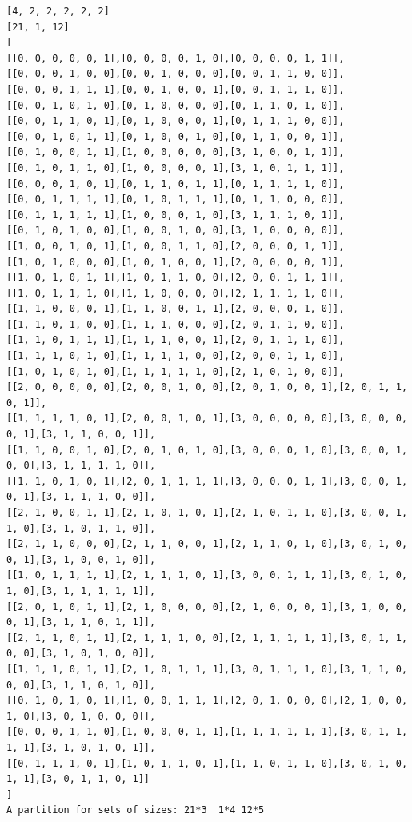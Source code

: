 \documentclass[final]{dmtcs-episciences}
\begin{document}
\begin{appendices}
\begin{verbatim} 
[4, 2, 2, 2, 2, 2]
[21, 1, 12]
[
[[0, 0, 0, 0, 0, 1],[0, 0, 0, 0, 1, 0],[0, 0, 0, 0, 1, 1]],
[[0, 0, 0, 1, 0, 0],[0, 0, 1, 0, 0, 0],[0, 0, 1, 1, 0, 0]],
[[0, 0, 0, 1, 1, 1],[0, 0, 1, 0, 0, 1],[0, 0, 1, 1, 1, 0]],
[[0, 0, 1, 0, 1, 0],[0, 1, 0, 0, 0, 0],[0, 1, 1, 0, 1, 0]],
[[0, 0, 1, 1, 0, 1],[0, 1, 0, 0, 0, 1],[0, 1, 1, 1, 0, 0]],
[[0, 0, 1, 0, 1, 1],[0, 1, 0, 0, 1, 0],[0, 1, 1, 0, 0, 1]],
[[0, 1, 0, 0, 1, 1],[1, 0, 0, 0, 0, 0],[3, 1, 0, 0, 1, 1]],
[[0, 1, 0, 1, 1, 0],[1, 0, 0, 0, 0, 1],[3, 1, 0, 1, 1, 1]],
[[0, 0, 0, 1, 0, 1],[0, 1, 1, 0, 1, 1],[0, 1, 1, 1, 1, 0]],
[[0, 0, 1, 1, 1, 1],[0, 1, 0, 1, 1, 1],[0, 1, 1, 0, 0, 0]],
[[0, 1, 1, 1, 1, 1],[1, 0, 0, 0, 1, 0],[3, 1, 1, 1, 0, 1]],
[[0, 1, 0, 1, 0, 0],[1, 0, 0, 1, 0, 0],[3, 1, 0, 0, 0, 0]],
[[1, 0, 0, 1, 0, 1],[1, 0, 0, 1, 1, 0],[2, 0, 0, 0, 1, 1]],
[[1, 0, 1, 0, 0, 0],[1, 0, 1, 0, 0, 1],[2, 0, 0, 0, 0, 1]],
[[1, 0, 1, 0, 1, 1],[1, 0, 1, 1, 0, 0],[2, 0, 0, 1, 1, 1]],
[[1, 0, 1, 1, 1, 0],[1, 1, 0, 0, 0, 0],[2, 1, 1, 1, 1, 0]],
[[1, 1, 0, 0, 0, 1],[1, 1, 0, 0, 1, 1],[2, 0, 0, 0, 1, 0]],
[[1, 1, 0, 1, 0, 0],[1, 1, 1, 0, 0, 0],[2, 0, 1, 1, 0, 0]],
[[1, 1, 0, 1, 1, 1],[1, 1, 1, 0, 0, 1],[2, 0, 1, 1, 1, 0]],
[[1, 1, 1, 0, 1, 0],[1, 1, 1, 1, 0, 0],[2, 0, 0, 1, 1, 0]],
[[1, 0, 1, 0, 1, 0],[1, 1, 1, 1, 1, 0],[2, 1, 0, 1, 0, 0]],
[[2, 0, 0, 0, 0, 0],[2, 0, 0, 1, 0, 0],[2, 0, 1, 0, 0, 1],[2, 0, 1, 1, 0, 1]],
[[1, 1, 1, 1, 0, 1],[2, 0, 0, 1, 0, 1],[3, 0, 0, 0, 0, 0],[3, 0, 0, 0, 0, 1],[3, 1, 1, 0, 0, 1]],
[[1, 1, 0, 0, 1, 0],[2, 0, 1, 0, 1, 0],[3, 0, 0, 0, 1, 0],[3, 0, 0, 1, 0, 0],[3, 1, 1, 1, 1, 0]],
[[1, 1, 0, 1, 0, 1],[2, 0, 1, 1, 1, 1],[3, 0, 0, 0, 1, 1],[3, 0, 0, 1, 0, 1],[3, 1, 1, 1, 0, 0]],
[[2, 1, 0, 0, 1, 1],[2, 1, 0, 1, 0, 1],[2, 1, 0, 1, 1, 0],[3, 0, 0, 1, 1, 0],[3, 1, 0, 1, 1, 0]],
[[2, 1, 1, 0, 0, 0],[2, 1, 1, 0, 0, 1],[2, 1, 1, 0, 1, 0],[3, 0, 1, 0, 0, 1],[3, 1, 0, 0, 1, 0]],
[[1, 0, 1, 1, 1, 1],[2, 1, 1, 1, 0, 1],[3, 0, 0, 1, 1, 1],[3, 0, 1, 0, 1, 0],[3, 1, 1, 1, 1, 1]],
[[2, 0, 1, 0, 1, 1],[2, 1, 0, 0, 0, 0],[2, 1, 0, 0, 0, 1],[3, 1, 0, 0, 0, 1],[3, 1, 1, 0, 1, 1]],
[[2, 1, 1, 0, 1, 1],[2, 1, 1, 1, 0, 0],[2, 1, 1, 1, 1, 1],[3, 0, 1, 1, 0, 0],[3, 1, 0, 1, 0, 0]],
[[1, 1, 1, 0, 1, 1],[2, 1, 0, 1, 1, 1],[3, 0, 1, 1, 1, 0],[3, 1, 1, 0, 0, 0],[3, 1, 1, 0, 1, 0]],
[[0, 1, 0, 1, 0, 1],[1, 0, 0, 1, 1, 1],[2, 0, 1, 0, 0, 0],[2, 1, 0, 0, 1, 0],[3, 0, 1, 0, 0, 0]],
[[0, 0, 0, 1, 1, 0],[1, 0, 0, 0, 1, 1],[1, 1, 1, 1, 1, 1],[3, 0, 1, 1, 1, 1],[3, 1, 0, 1, 0, 1]],
[[0, 1, 1, 1, 0, 1],[1, 0, 1, 1, 0, 1],[1, 1, 0, 1, 1, 0],[3, 0, 1, 0, 1, 1],[3, 0, 1, 1, 0, 1]]
]
A partition for sets of sizes: 21*3  1*4 12*5
\end{verbatim}
\newpage


\end{appendices}
\end{document}
